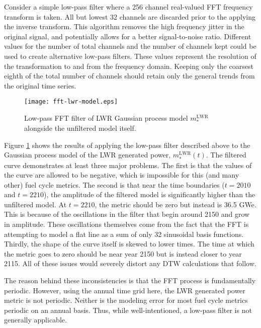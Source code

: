 \documentclass{ntmanuscript}
\newcommand{\LWR}{\mathrm{LWR}}
\begin{document}
Consider a simple low-pass filter where a 256 channel real-valued FFT frequency
transform is taken.  All but lowest 32 channels are discarded prior to the applying
the inverse transform. This algorithm removes the
high frequency jitter in the original signal, and
potentially allows for a better signal-to-noise ratio. Different values
for the number of total channels and the number of channels kept could be
used to create alternative low-pass filters. These values represent the
resolution of the transformation to and from the frequency domain. Keeping
only the coarsest eighth of the total number of channels should retain only
the general trends from the original time series.

\begin{figure}[htb]
\centering
\texttt{[image: fft-lwr-model.eps]}
\caption{Low-pass FFT filter of LWR Gaussian process model $m_*^\LWR$ alongside
the unfiltered model itself.}
\label{fft-lwr-model}
\end{figure}

Figure \ref{fft-lwr-model} shows the results of applying the low-pass filter
described above to the Gaussian process model of the LWR generated power,
$m_*^\LWR(t)$.  The filtered curve demonstrates at least three major problems.  The
first is that the values of the curve are allowed to be negative, which is
impossible for this (and many other) fuel cycle metrics.  The second is that
near the time boundaries ($t=2010$ and $t=2210$), the amplitude of the filtered model
is significantly higher than the unfiltered model. At $t=2210$, the metric
should be zero but
instead is 36.5 GWe. This is because of the oscillations in the filter that
begin around 2150 and grow in amplitude. These oscillations themselves
come from the fact that the FFT is attempting to model a flat line as a sum
of only 32 sinusoidal basis functions.
Thirdly, the shape of the curve itself is skewed to lower
times. The time at which the metric goes to zero should be near year 2150 but is
instead closer to year 2115.  All of these issues would severely distort any
DTW calculations that follow.

The reason behind these inconsistencies is that the FFT process is fundamentally
periodic.  However, using the annual time grid here, the LWR generated power metric
is not periodic. Neither is the modeling error for most fuel cycle metrics periodic
on an annual basis.
Thus, while well-intentioned, a low-pass filter is not generally applicable.
\end{document}
